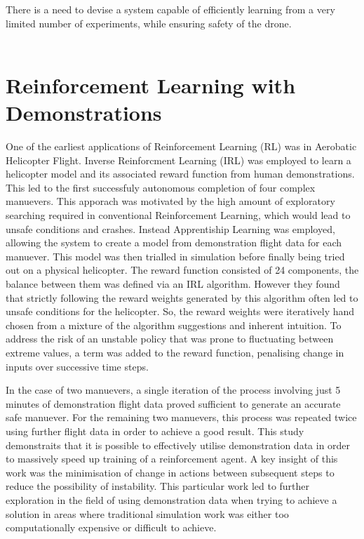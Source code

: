 There is a need to devise a system capable of efficiently learning from a very limited number of experiments, while ensuring safety of the drone. \\\\

\section{Reinforcement Learning with Demonstrations}

One of the earliest applications of Reinforcement Learning (RL) was in Aerobatic Helicopter Flight\cite{abbeelRLAerobaticFlight}.
Inverse Reinforcment Learning (IRL) was employed to learn a helicopter model and its associated reward function from human demonstrations.
This led to the first successfuly autonomous completion of four complex manuevers.
This apporach was motivated by the high amount of exploratory searching required in conventional Reinforcement Learning, which would lead to unsafe conditions and crashes.
Instead Apprentiship Learning was employed, allowing the system to create a model from demonstration flight data for each manuever.
This model was then trialled in simulation before finally being tried out on a physical helicopter.
The reward function consisted of 24 components, the balance between them was defined via an IRL algorithm.
However they found that strictly following the reward weights generated by this algorithm often led to unsafe conditions for the helicopter.
So, the reward weights were iteratively hand chosen from a mixture of the algorithm suggestions and inherent intuition. 
To address the risk of an unstable policy that was prone to fluctuating between extreme values, a term was added to the reward function, penalising change in inputs over successive time steps.

In the case of two manuevers, a single iteration of the process involving just 5 minutes of demonstration flight data proved sufficient to generate an accurate safe manuever.
For the remaining two manuevers, this process was repeated twice using further flight data in order to achieve a good result.
This study demonstraits that it is possible to effectively utilise demonstration data in order to massively speed up training of a reinforcement agent.
A key insight of this work was the minimisation of change in actions between subsequent steps to reduce the possibility of instability.
This particular work led to further exploration in the field of using demonstration data when trying to achieve a solution in areas where traditional simulation work was either too computationally expensive or difficult to achieve.

